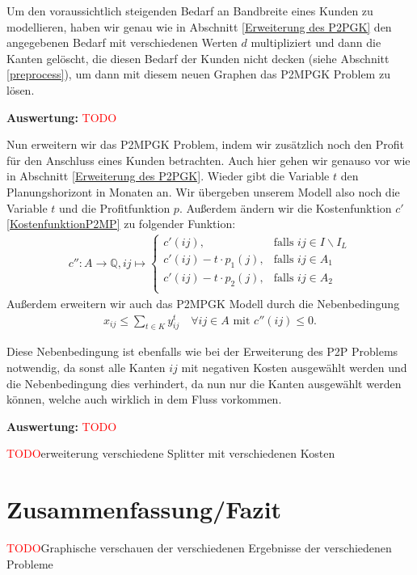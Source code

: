 \documentclass[11pt,a4paper]{article}
\newcommand{\Q}{\mathbb{Q}}
\newcommand{\TODO}{\textcolor{red}{TODO}}
\theoremstyle{my_th_style1}
\begin{document}
Um den voraussichtlich steigenden Bedarf an Bandbreite eines Kunden zu modellieren, haben wir genau wie in Abschnitt \ref{Erweiterung des P2PGK} den angegebenen Bedarf mit verschiedenen Werten $d$ multipliziert und dann die Kanten gel\"oscht, die diesen Bedarf der Kunden nicht decken (siehe Abschnitt \ref{preprocess}), um dann mit diesem neuen Graphen das P2MPGK Problem zu l\"osen.
 
 \textbf{Auswertung:} \TODO
 
  
Nun erweitern wir das P2MPGK Problem, indem wir zusätzlich noch den Profit für den Anschluss eines Kunden betrachten.
Auch hier gehen wir genauso vor wie in Abschnitt \ref{Erweiterung des P2PGK}.
Wieder gibt die Variable $t$ den Planungshorizont in Monaten an.
Wir \"ubergeben unserem Modell also noch die Variable $t$ und die Profitfunktion $p$.
Außerdem \"andern wir die Kostenfunktion \(c'\) \eqref{KostenfunktionP2MP}  zu folgender Funktion:
\begin{align*}
  c'': A  \rightarrow \Q,  ij  \mapsto \left\{\begin{array}{cl} 
 c'(ij), & \text{falls } ij \in I\backslash I_L \\ 
  c'(ij) -t  \cdot p_1(j), & \text{falls } ij \in A_1 \\ 
    c'(ij) -t \cdot p_2(j), & \text{falls } ij \in  A_2 \\ 
\end{array}  \right.
\end{align*}
Außerdem erweitern wir auch das P2MPGK Modell durch die Nebenbedingung 
\begin{align*}
 x_{ij} \leq \displaystyle\sum_{t \in K} y_{ij}^t \quad \forall ij \in A \text{ mit } c''(ij) \leq 0.
\end{align*}

Diese Nebenbedingung ist ebenfalls wie bei der Erweiterung des P2P Problems notwendig, da sonst alle Kanten $ij$ mit negativen Kosten ausgewählt werden und die Nebenbedingung dies verhindert, da nun nur die Kanten ausgew\"ahlt werden können, welche auch wirklich in dem Fluss vorkommen.
 
 \textbf{Auswertung:} \TODO
 
 \TODO erweiterung verschiedene Splitter mit verschiedenen Kosten
 
 \section{Zusammenfassung/Fazit}
\TODO Graphische verschauen der verschiedenen Ergebnisse der verschiedenen Probleme
 
\end{document}
